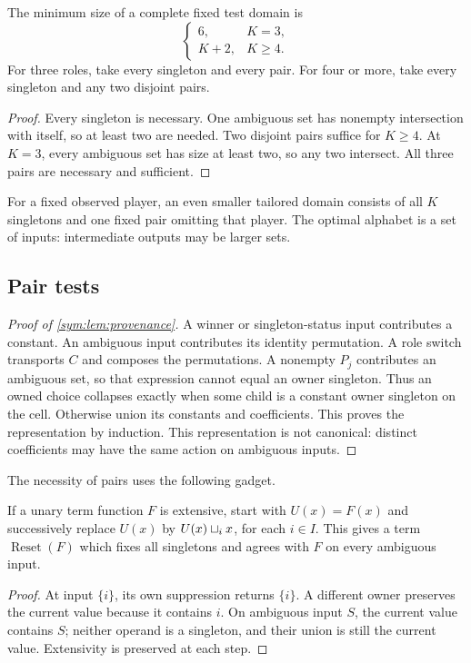 \begin{corollary}\label{view:cor:optimal}
The minimum size of a complete fixed test domain is
\[
 \begin{cases}6,&K=3,\\K+2,&K\geq4.\end{cases}
\]
For three roles, take every singleton and every pair. For four or more,
take every singleton and any two disjoint pairs.
\end{corollary}
\begin{proof}
Every singleton is necessary. One ambiguous set has nonempty
intersection with itself, so at least two are needed. Two disjoint pairs
suffice for $K\geq4$. At $K=3$, every ambiguous set has size at least
two, so any two intersect. All three pairs are necessary and sufficient.
\end{proof}

For a fixed observed player, an even smaller tailored domain consists of all $K$ singletons and one fixed pair omitting that player. The optimal alphabet is a set of inputs: intermediate outputs may be larger sets.

\subsection{Pair tests}\label{app:proofs-tests}

\begin{proof}[Proof of \cref{sym:lem:provenance}]
A winner or singleton-status input contributes a constant. An ambiguous
input contributes its identity permutation. A role switch transports
$C$ and composes the permutations. A nonempty $P_j$ contributes an
ambiguous set, so that expression cannot equal an owner singleton. Thus
an owned choice collapses exactly when some child is a constant owner
singleton on the cell. Otherwise union its constants and coefficients.
This proves the representation by induction. This representation is not canonical: distinct coefficients may have the same action on ambiguous
inputs.
\end{proof}

The necessity of pairs uses the following gadget.

\begin{lemma}\label{sym:lem:reset}
If a unary term function $F$ is extensive, start with $U(x)=F(x)$ and
successively replace $U(x)$ by $U(x)\mathbin{\sqcup_{i}} x$, for each $i\in I$. This gives a term
$\operatorname{Reset}(F)$ which fixes all singletons and agrees with $F$
on every ambiguous input.
\end{lemma}
\begin{proof}
At input $\{i\}$, its own suppression returns $\{i\}$. A different
owner preserves the current value because it contains $i$. On ambiguous
input $S$, the current value contains $S$; neither operand is a
singleton, and their union is still the current value. Extensivity is
preserved at each step.
\end{proof}

